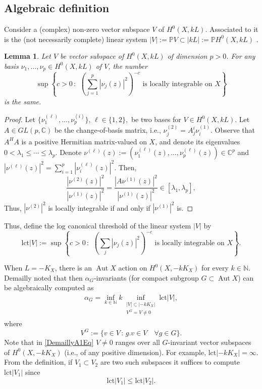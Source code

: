 \documentclass{article}
\newcommand{\lct}{\mathrm{lct}}
\newcommand{\CC}{\mathbb {C}}
\newcommand{\NN}{{\mathbb N}}
\newcommand{\PP}{{\mathbb P}}
\renewcommand{\>}{\rightarrow}
\DeclareMathOperator{\Aut}{Aut}
\theoremstyle{plain}
\newtheorem{lemma}[theorem]{Lemma}
\theoremstyle{definition}
\newcommand{\beq}{\begin{equation}}
\newcommand{\eeq}{\end{equation}}
\newcommand{\bpf}{\begin{proof}}
\newcommand{\epf}{\end{proof}}
\newcommand{\blem}{\begin{lemma}}
\newcommand{\elem}{\end{lemma}}
\def\lb#1{\label{#1}}
\def\q{\quad}
\begin{document}
\subsection{Algebraic definition}

Consider a (complex) non-zero vector subspace $V$ of $H^0(X,kL)$.
Associated to it is the (not necessarily complete) 
linear system $|V|:=\PP V\subset |kL|:=\PP H^0(X,kL)$ 
\cite[p. 137]{GH}. 
    \blem
    Let $V$ be vector subspace of $H^0(X,kL)$ of dimension $p>0$.
For any basis $\nu_1,\ldots,\nu_p\in H^0(X,kL)$ of $V$, the number
$$
    \sup\left\{c>0\,:\,~ \left(\sum_{j=1}^p|\nu_j(z)|^2\right)^{-{c}} \text{ is locally integrable on }X \right\}
$$
is the same.    \elem
\bpf
Let $\{\nu^{(\ell)}_1,\ldots,\nu^{(i)}_p\}, \, \ell\in\{1,2\},$ be two bases for $V\in H^0(X,kL)$.
Let $A\in GL(p,\CC)$ be the change-of-basis matrix, i.e., 
$\nu^{(2)}_j=A^i_j\nu^{(1)}_i$. Observe that $A^HA$ is a positive
Hermitian matrix-valued on $X$, and denote its eigenvalues 
$0<\lambda_1\le\cdots\le \lambda_p$.
Denote
$\nu^{(\ell)}(z):=(\nu^{(\ell)}_1(z),\ldots,\nu^{(\ell)}_p(z))\in\CC^p$ and
$|\nu^{(\ell)}(z)|^2=\sum_{i=1}^p|\nu^{(\ell)}_i(z)|^2$.
Then,
$$
\frac{|\nu^{(2)}(z)|^2}{|\nu^{(1)}(z)|^2}=
\frac{|A\nu^{(1)}(z)|^2}{|\nu^{(1)}(z)|^2}\in  
[\lambda_1,\lambda_p],
$$
Thus, $|\nu^{(2)}|^2$ is locally integrable
if and only if $|\nu^{(1)}|^2$ is.
\epf
Thus, define the log canonical threshold of the linear system $|V|$ by
\beq
    \lb{lctSigmaEq}
        \lct|V|
        :=\sup\left\{c>0\,:\,~ \left(\sum_j|\nu_j(z)|^2\right)^{-{c}} \text{ is locally integrable on }X \right\}.
    \eeq
   
When $L=-K_X$, there is an $\Aut X$ action on $H^0(X,-kK_X)$
for every $k\in\NN$. Demailly \cite[Theorem A.3, (A.1)]{CS08} noted that then 
$\alpha_G$-invariants (for compact subgroup $G\subset\Aut X$) can be algebraically computed as
    \begin{align}
    \lb{DemaillyA1Eq}
        \alpha_G
        =\inf_{k\in\NN}k\inf_{\substack{|V|\subset|-kK_X|\\ V^G=V\not=0}}\lct%
        |V|,
    \end{align}
    where 
    $$
    V^G:=\{v\in V\,:\, g.v\in V\q \forall g\in G\}.
    $$
    Note that in \eqref{DemaillyA1Eq}
    $V\not=0$ ranges over all $G$-invariant vector subspaces of $H^0(X,-kK_X)$ (i.e.,
    of any positive dimension).
    For example, $\lct|-kK_X|=\infty$. 
    From the definition, if $V_1\subset V_2$ are
    two such subspaces it suffices to compute $\lct|V_1|$ since 
    \beq
    \lb{lctinclusionEq}
    \lct|V_1|\le \lct|V_2|.
    \eeq
    
\end{document}
